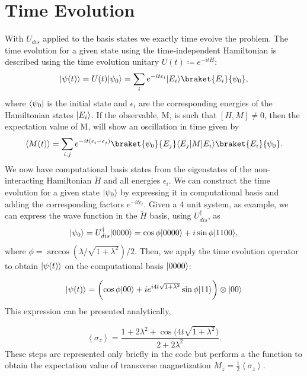 \documentclass[12pt]{article}
\newcommand*{\eu}{e}
\DeclarePairedDelimiter{\bra}{\langle}{\rvert}
\DeclarePairedDelimiter{\ket}{\lvert}{\rangle}
\begin{document}
  \section{Time Evolution}
  With $U_{dis}$ applied to the basis states we exactly time evolve the problem. The time evolution for a given state using the time-independent Hamiltonian is described using the time evolution unitary $U(t) \coloneqq \eu^{-itH}$:
  \begin{equation}
    \ket{\psi(t)} = U(t)\ket{\psi_{0}} = \sum_{i} \eu^{-it\epsilon_{i}} \ket{E_{i}}\braket{E_{i}}{\psi_{0}},
  \end{equation}
  where $\bra{\psi_{0}}$ is the initial state and $\epsilon_{i}$ are the corresponding energies of the Hamiltonian states $\ket{E_{i}}$. If the observable, M, is such that $[H,M] \neq 0$, then the expectation value of M, will show an oscillation in time given by
  \begin{equation}
    \left\langle M(t)\right\rangle = \sum_{i,j}\eu^{-it(\epsilon_{i}-\epsilon_{j})}\braket{\psi_{0}}{E_{j}}\bra{E_{j}}M\ket{E_{i}}\braket{E_{i}}{\psi_{0}}.
  \end{equation}
  We now have computational basis states from the eigenstates of the non-interacting Hamiltonian $\tilde{H}$ and all energies $\epsilon_{i}$. We can construct the time evolution for a given state $\ket{\psi_{0}}$ by expressing it in computational basis and adding the corresponding factors $\eu^{-it\epsilon_{i}}$. Given a 4 unit system, as example, we can express the wave function in the $\tilde{H}$ basis, using $U_{dis}^{\dagger}$, as
  \begin{equation}
    \ket{\psi_{0}} = U_{dis}^{\dagger}\ket{0000} = \cos \phi\ket{0000} + i\sin \phi\ket{1100},
  \end{equation}
  where $\phi = \arccos(\lambda/\sqrt{1+\lambda ^2})/2$. Then, we apply the time evolution operator to obtain $\ket{\psi (t)}$ on the computational basis $\ket{0000}$:

  \begin{equation}
    \ket{\psi (t)} = \biggl( \cos \phi\ket{00} + i\eu^{i4t\sqrt{1+\lambda ^2}} \sin \phi \ket{11} \biggr) \otimes \ket{00}
  \end{equation}
  This expression can be presented analytically,

  \begin{equation}
    \left\langle \sigma_{z} \right\rangle = \frac{1 + 2\lambda ^2 + \cos \biggl( 4t\sqrt{1 + \lambda ^2}\biggr)}{2 + 2\lambda ^2}.
  \end{equation}
  These steps are represented only briefly in the code but perform a the function to obtain the expectation value of transverse magnetization $M_{z} = \frac{1}{2}\left\langle \sigma_{z}\right\rangle$.
\end{document}
